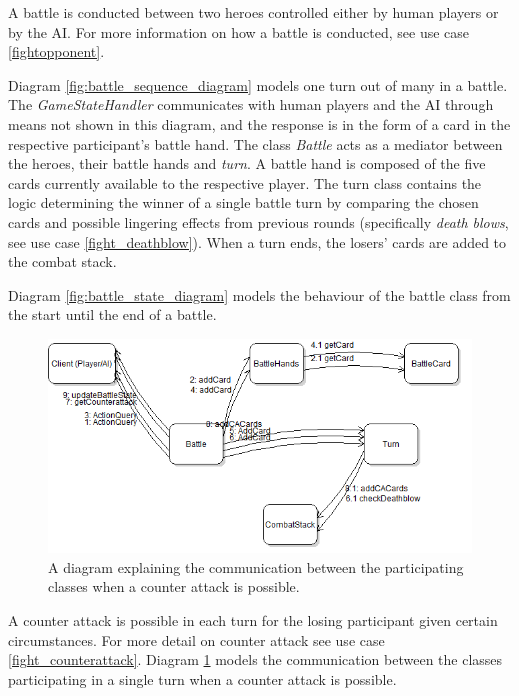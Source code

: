 A battle is conducted between two heroes controlled either by human players or by the AI. For more information on how a battle is conducted, see use case \ref{fightopponent}.

Diagram \ref{fig:battle_sequence_diagram} models one turn out of many in a battle. The \emph{GameStateHandler} communicates with human players and the AI through means not shown in this diagram, and the response is in the form of a card in the respective participant's battle hand. The class \emph{Battle} acts as a mediator between the heroes, their battle hands and \emph{turn}. A battle hand is composed of the five cards currently available to the respective player. The turn class contains the logic determining the winner of a single battle turn by comparing the chosen cards and possible lingering effects from previous rounds (specifically \emph{death blows}, see use case \ref{fight_deathblow}). When a turn ends, the losers' cards are added to the combat stack.

Diagram \ref{fig:battle_state_diagram} models the behaviour of the battle class from the start until the end of a battle.

\begin{figure}[h]
\centering
\begin{center}
\includegraphics{diagrams/CounterAttackCommDiagram.png}
\end{center}
\caption{A diagram explaining the communication between the participating classes when a counter attack is possible.}
\label{fig:counter_attack_comm_diagram}
\end{figure}

A counter attack is possible in each turn for the losing participant given certain circumstances. For more detail on counter attack see use case \ref{fight_counterattack}. Diagram \ref{fig:counter_attack_comm_diagram} models the communication between the classes participating in a single turn when a counter attack is possible.


